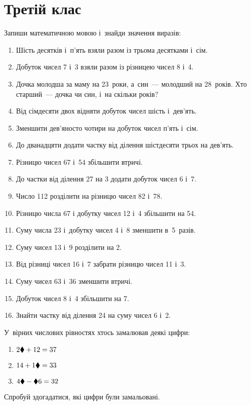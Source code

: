 \chapter{Третій клас}

\problem
Запиши математичною мовою і~знайди значення виразів:
\begin{enumerate}
    \item Шість десятків і~п'ять взяли разом із трьома десятками і~сім.
    \item Добуток чисел 7 і~3 взяли разом із різницею чисел 8 і~4.
    \item Дочка молодша за маму на 23~роки, а~син~--- молодший на 28~років.
    Хто старший~--- дочка чи син, і~на скільки років?
    \item Від сімдесяти двох відняти добуток чисел шість і~дев'ять.
    \item Зменшити дев'яносто чотири на добуток чисел п'ять і~сім.
    \item До дванадцяти додати частку від ділення шістдесяти трьох на дев'ять.
    \item Різницю чисел 67 і~54 збільшити втричі.
    \item До частки від ділення 27 на 3 додати добуток чисел 6 і~7.
    \item Число 112 розділити на різницю чисел 82 і~78.
    \item Різницю числа 67 і добутку чисел 12 і~4 збільшити на 54.
    \item Суму числа 23 і~добутку чисел 4 і~8 зменшити в~5~разів.
    \item Суму чисел 13 і~9 розділити на 2.
    \item Від різниці чисел 16 і~7 забрати різницю чисел 11 і~3.
    \item Суму чисел 63 і~36 зменшити втричі.
    \item Добуток чисел 8 і~4 збільшити на 7.
    \item Знайти частку від ділення 24 на суму чисел 6 і~2.
\end{enumerate}


\problem
У~вірних числових рівностях хтось замалював деякі цифри:
\begin{multicols}{2}
    \begin{enumerate}
        \item $2\blacklozenge + 12 = 37$
        \item $14 + 1\blacklozenge = 33$
        \item $4\blacklozenge - \blacklozenge6 = 32$
    \end{enumerate}
\end{multicols}
Спробуй здогадатися, які цифри були замальовані.


